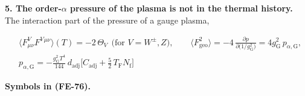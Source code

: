 \documentclass[
  10pt,
]{article}
\begin{document}
\textbf{5. The order-\(\alpha\) pressure of the plasma is not in the
thermal history.} The interaction part of the pressure of a gauge
plasma,

\[
\begin{aligned}
&\big\langle F^V_{\mu\nu}F^{V}{}^{\mu\nu}\big\rangle(T) = -2\,\Theta_V\ \ \text{(for $V = W^\pm, Z$)},\qquad
 \big\langle F_{\mathrm{geo}}^2\big\rangle = -4\,\frac{\partial p}{\partial\big(1/g_{\mathrm{G}}^2\big)}
 = 4g_{\mathrm{G}}^2\,p_{\alpha,\mathrm{G}},\\
&p_{\alpha,\mathrm{G}} = -\frac{g_{\mathrm{G}}^2T^4}{144}\,d_{\mathrm{adj}}\Big[C_{\mathrm{adj}} +
 \frac52\,T_{\mathrm{F}}N_{\mathrm{f}}\Big]
\end{aligned} \tag{FE-76}
\]

\textbf{Symbols in (FE-76).}
\end{document}
